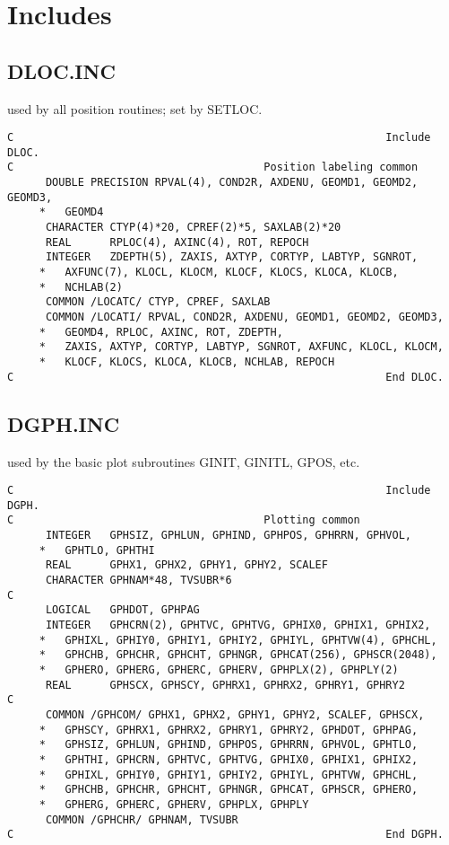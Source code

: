\section{Includes}
\subsection{DLOC.INC}
used by all position routines; set by SETLOC.

\begin{verbatim}
C                                                          Include DLOC.
C                                       Position labeling common
      DOUBLE PRECISION RPVAL(4), COND2R, AXDENU, GEOMD1, GEOMD2, GEOMD3,
     *   GEOMD4
      CHARACTER CTYP(4)*20, CPREF(2)*5, SAXLAB(2)*20
      REAL      RPLOC(4), AXINC(4), ROT, REPOCH
      INTEGER   ZDEPTH(5), ZAXIS, AXTYP, CORTYP, LABTYP, SGNROT,
     *   AXFUNC(7), KLOCL, KLOCM, KLOCF, KLOCS, KLOCA, KLOCB,
     *   NCHLAB(2)
      COMMON /LOCATC/ CTYP, CPREF, SAXLAB
      COMMON /LOCATI/ RPVAL, COND2R, AXDENU, GEOMD1, GEOMD2, GEOMD3,
     *   GEOMD4, RPLOC, AXINC, ROT, ZDEPTH,
     *   ZAXIS, AXTYP, CORTYP, LABTYP, SGNROT, AXFUNC, KLOCL, KLOCM,
     *   KLOCF, KLOCS, KLOCA, KLOCB, NCHLAB, REPOCH
C                                                          End DLOC.

\end{verbatim}

\subsection{DGPH.INC}
used by the basic plot subroutines GINIT, GINITL, GPOS, etc.

\begin{verbatim}
C                                                          Include DGPH.
C                                       Plotting common
      INTEGER   GPHSIZ, GPHLUN, GPHIND, GPHPOS, GPHRRN, GPHVOL,
     *   GPHTLO, GPHTHI
      REAL      GPHX1, GPHX2, GPHY1, GPHY2, SCALEF
      CHARACTER GPHNAM*48, TVSUBR*6
C
      LOGICAL   GPHDOT, GPHPAG
      INTEGER   GPHCRN(2), GPHTVC, GPHTVG, GPHIX0, GPHIX1, GPHIX2,
     *   GPHIXL, GPHIY0, GPHIY1, GPHIY2, GPHIYL, GPHTVW(4), GPHCHL,
     *   GPHCHB, GPHCHR, GPHCHT, GPHNGR, GPHCAT(256), GPHSCR(2048),
     *   GPHERO, GPHERG, GPHERC, GPHERV, GPHPLX(2), GPHPLY(2)
      REAL      GPHSCX, GPHSCY, GPHRX1, GPHRX2, GPHRY1, GPHRY2
C
      COMMON /GPHCOM/ GPHX1, GPHX2, GPHY1, GPHY2, SCALEF, GPHSCX,
     *   GPHSCY, GPHRX1, GPHRX2, GPHRY1, GPHRY2, GPHDOT, GPHPAG,
     *   GPHSIZ, GPHLUN, GPHIND, GPHPOS, GPHRRN, GPHVOL, GPHTLO,
     *   GPHTHI, GPHCRN, GPHTVC, GPHTVG, GPHIX0, GPHIX1, GPHIX2,
     *   GPHIXL, GPHIY0, GPHIY1, GPHIY2, GPHIYL, GPHTVW, GPHCHL,
     *   GPHCHB, GPHCHR, GPHCHT, GPHNGR, GPHCAT, GPHSCR, GPHERO,
     *   GPHERG, GPHERC, GPHERV, GPHPLX, GPHPLY
      COMMON /GPHCHR/ GPHNAM, TVSUBR
C                                                          End DGPH.

\end{verbatim}

